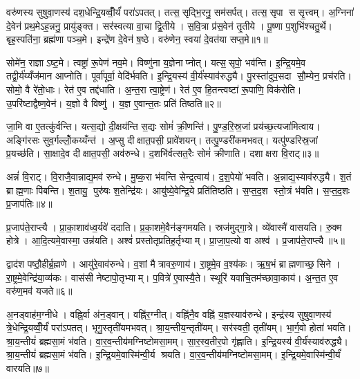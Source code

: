 
\clearpage
{}
\setcounter{anuvakam}{0}
वरु॑णस्य सुषुवा॒णस्य॑ दश॒धेन्द्रि॒यव्वीँ॒र्यं॑ परा॑ऽपतत्। तत्स॒सृद्भि॒रनु॒ सम॑सर्पत्। तत्स॒सृपा ससृ॒त्त्वम्। अ॒ग्निना॑ दे॒वेन॑ प्रथ॒मेऽह॒न्ननु॒ प्रायु॑ङ्क्त। सर॑स्वत्या वा॒चा द्वि॒तीये। स॒वि॒त्रा प्र॑स॒वेन॑ तृ॒तीये। पू॒ष्णा प॒शुभि॑श्चतु॒र्थे। बृह॒स्पति॑ना॒ ब्रह्म॑णा पञ्च॒मे। इन्द्रे॑ण दे॒वेन॑ ष॒ष्ठे। वरु॑णेन॒ स्वया॑ दे॒वत॑या सप्त॒मे॥१॥

सोमे॑न॒ राज्ञाऽष्ट॒मे। त्वष्ट्रा॑ रू॒पेण॑ नव॒मे। विष्णु॑ना य॒ज्ञेनाप्नोत्। यत्स॒सृपो॒ भव॑न्ति। इ॒न्द्रि॒यमे॒व तद्वी॒र्य॑य्यँज॑मान आप्नोति। पूर्वा॑पूर्वा॒ वेदि॑र्भवति। इ॒न्द्रि॒यस्य॑ वी॒र्य॑स्याव॑रुद्ध्यै। पु॒रस्ता॑दुप॒सदा सौ॒म्येन॒ प्रच॑रति। सोमो॒ वै रे॑तो॒धाः। रेत॑ ए॒व तद्द॑धाति। अ॒न्त॒रा त्वा॒ष्ट्रेण॑। रेत॑ ए॒व हि॒तन्त्वष्टा॑ रू॒पाणि॒ विक॑रोति। उ॒परि॑ष्टाद्वैष्ण॒वेन॑। य॒ज्ञो वै विष्णु॑। य॒ज्ञ ए॒वान्त॒तः प्रति॑ तिष्ठति॥२॥\anuvakamend[स॒प्त॒मे द॑धाति॒ पञ्च॑ च]

जा॒मि वा ए॒तत्कु॑र्वन्ति। यत्स॒द्यो दी॒क्षय॑न्ति स॒द्यः सोमं॑ क्री॒णन्ति॑। पु॒ण्ड॒रि॒स्र॒जां प्रय॑च्छ॒त्यजा॑मित्वाय। अङ्गि॑रसः सुव॒र्गल्लोँ॒कय्यँन्त॑। अ॒प्सु दीक्षात॒पसी॒ प्रावे॑शयन्। तत्पु॒ण्डरी॑कमभवत्। यत्पु॑ण्डरिस्र॒जां प्र॒यच्छ॑ति। सा॒क्षादे॒व दीक्षात॒पसी॒ अव॑रुन्धे। द॒शभि॑र्वत्सत॒रैः सोमं॑ क्रीणाति। दशाक्षरा वि॒राट्॥३॥

अन्नं॑ वि॒राट्। वि॒राजै॒वान्नाद्य॒मव॑ रुन्धे। मु॒ष्क॒रा भ॑वन्ति सेन्द्र॒त्वाय॑। द॒श॒पेयो॑ भवति। अ॒न्नाद्य॒स्याव॑रुद्ध्यै। श॒तं ब्राह्म॒णाः पि॑बन्ति। श॒तायु॒ पुरु॑षः श॒तेन्द्रि॑यः। आयु॑ष्ये॒वेन्द्रि॒ये प्रति॑तिष्ठति। स॒प्त॒द॒श स्तो॒त्रं भ॑वति। स॒प्त॒द॒शः प्र॒जाप॑तिः॥४॥

प्र॒जाप॑ते॒राप्त्यै। प्रा॒का॒शाव॑ध्व॒र्यवे॑ ददाति। प्र॒का॒शमे॒वैन॑ङ्गमयति। स्रज॑मुद्गा॒त्रे। व्ये॑वास्मै॑ वासयति। रु॒क्म होत्रे। आ॒दि॒त्यमे॒वास्मा॒ उन्न॑यति। अश्वं॑ प्रस्तोतृप्रतिह॒र्तृभ्याम्। प्रा॒जा॒प॒त्यो वा अश्व॑। प्र॒जाप॑ते॒राप्त्यै॥५॥

द्वाद॑श पष्ठौ॒हीर्ब्र॒ह्मणे। आयु॑रे॒वाव॑रुन्धे। व॒शां मैत्रावरु॒णाय॑। रा॒ष्ट्रमे॒व व॒श्य॑कः। ऋ॒ष॒भं ब्राह्मणाच्छ॒सिने। रा॒ष्ट्रमे॒वेन्द्रि॑या॒व्य॑कः। वास॑सी नेष्टापो॒तृभ्याम्। प॒वित्रे॑ ए॒वास्यै॒ते। स्थूरि॑ यवाचि॒तम॑च्छावा॒काय॑। अ॒न्त॒त ए॒व वरु॑ण॒मव॑ यजते॥६॥

अ॒नड्वाह॑म॒ग्नीधे। वह्नि॒र्वा अ॑न॒ड्वान्। वह्नि॑र॒ग्नीत्। वह्नि॑नै॒व वह्नि॑ य॒ज्ञस्याव॑रुन्धे। इन्द्र॑स्य सुषुवा॒णस्य॑ त्रे॒धेन्द्रि॒यव्वीँ॒र्यं॑ परा॑ऽपतत्। भृगु॒स्तृती॑यमभवत्। श्रा॒य॒न्तीय॒न्तृती॑यम्। सर॑स्वती॒ तृती॑यम्। भा॒र्ग॒वो होता॑ भवति। श्रा॒य॒न्तीयं॑ ब्रह्मसा॒मं भ॑वति। वा॒र॒व॒न्तीय॑मग्निष्टोमसा॒मम्। सा॒र॒स्व॒तीर॒पो गृ॑ह्णाति। इ॒न्द्रि॒यस्य॑ वी॒र्य॑स्याव॑रुद्ध्यै। श्रा॒य॒न्तीयं॑ ब्रह्मसा॒मं भ॑वति। इ॒न्द्रि॒यमे॒वास्मि॑न्वी॒र्य श्रयति। वा॒र॒व॒न्तीय॑मग्निष्टोमसा॒मम्। इ॒न्द्रि॒यमे॒वास्मि॑न्वी॒र्यं॑ वारयति॥७॥\anuvakamend[वि॒राट्प्र॒जाप॑ति॒रश्व॑ प्र॒जाप॑ते॒राप्त्यै॑ यजते ब्रह्मसा॒मं भ॑वति स॒प्त च॑]

